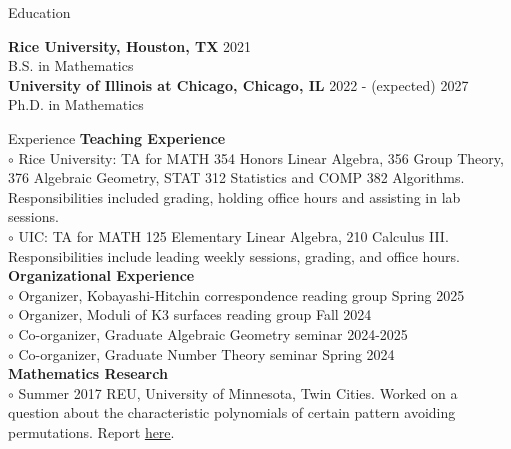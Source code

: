 \documentclass[
	12pt, %
]{resume} %
\begin{document}

\begin{rSection}{Education}
	
    \textbf{Rice University, Houston, TX} \hfill 2021\\
    B.S. in Mathematics\\
	\textbf{University of Illinois at Chicago, Chicago, IL} \hfill 2022 - (expected) 2027\\
    Ph.D. in Mathematics
\end{rSection}


\begin{rSection}{Experience}
    \textbf{Teaching Experience}\\
    $\circ$ Rice University: TA for MATH 354 Honors Linear Algebra, 356 Group Theory, 376 Algebraic Geometry, STAT 312 Statistics and COMP 382 Algorithms. Responsibilities included grading, holding office hours and assisting in lab sessions.\\
    $\circ$ UIC: TA for MATH 125 Elementary Linear Algebra, 210 Calculus III. Responsibilities include leading weekly sessions, grading, and office hours.\\
    \textbf{Organizational Experience}\\
    $\circ$ Organizer, Kobayashi-Hitchin correspondence reading group \hfill Spring 2025\\
    $\circ$ Organizer, Moduli of K3 surfaces reading group \hfill Fall 2024\\
    $\circ$ Co-organizer, Graduate Algebraic Geometry seminar \hfill 2024-2025\\
    $\circ$ Co-organizer, Graduate Number Theory seminar \hfill Spring 2024\\
    \textbf{Mathematics Research}\\
    $\circ$ Summer 2017 REU, University of Minnesota, Twin Cities. Worked on a question about the characteristic polynomials of certain pattern avoiding permutations. Report \href{http://www-users.math.umn.edu/~reiner/REU/GaetzHardtSridharTran_prob8_2017.pdf}{here}. 
\end{rSection}
\end{document}
